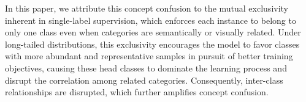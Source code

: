 



In this paper, we attribute this concept confusion to the mutual exclusivity inherent in single-label supervision, which enforces each instance to belong to only one class even when categories are semantically or visually related. Under long-tailed distributions, this exclusivity encourages the model to favor classes with more abundant and representative samples in pursuit of better training objectives, causing these head classes to dominate the learning process and disrupt the correlation among related categories. Consequently, inter-class relationships are disrupted, which further amplifies concept confusion.



